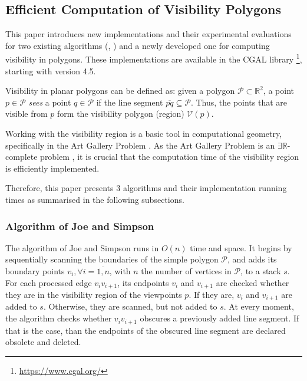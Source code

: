 \subsection{Efficient Computation of Visibility Polygons}
This paper \cite{DBLP:journals/corr/BungiuHHHK14} introduces new implementations and their experimental evaluations for two existing algorithms (\cite{joe1987corrections}, \cite{asano1985efficient}) and a newly developed one for computing visibility in polygons. These implementations are available in the CGAL library \footnote{\url{https://www.cgal.org/}}, starting with version 4.5.

Visibility in planar polygons can be defined as: given a polygon $\mathcal P \subset \mathbb R^2$, a point $p \in \mathcal P$ \textit{sees} a point $q \in \mathcal P$ if the line segment $\overline{pq} \subseteq \mathcal P$. Thus, the points that are visible from $p$ form the visibility polygon (region) $\mathcal V(p)$.

Working with the visibility region is a basic tool in computational geometry, specifically in the Art Gallery Problem \cite{o1987art}. As the Art Gallery Problem \cite{o1987art} is an $\exists \mathbb R$-complete problem \cite{abrahamsen2021art}, it is crucial that the computation time of the visibility region is efficiently implemented. 

Therefore, this paper presents 3 algorithms and their implementation running times as summarised in the following subsections.

\subsubsection{Algorithm of Joe and Simpson \cite{joe1987corrections}}
The algorithm of Joe and Simpson \cite{joe1987corrections} runs in $O(n)$ time and space. It begins by sequentially scanning the boundaries of the simple polygon $\mathcal P$, and adds its boundary points $v_i, \forall i = \overline{1, n}$, with $n$ the number of vertices in $\mathcal P$, to a stack $s$. For each processed edge $v_iv_{i + 1}$, its endpoints $v_i$ and $v_{i + 1}$ are checked whether they are in the visibility region of the viewpoints $p$. If they are, $v_i$ and $v_{i + 1}$ are added to $s$. Otherwise, they are scanned, but not added to $s$. At every moment, the algorithm checks whether $v_iv_{i + 1}$ obscures a previously added line segment. If that is the case, than the endpoints of the obscured line segment are declared obsolete and deleted. 

